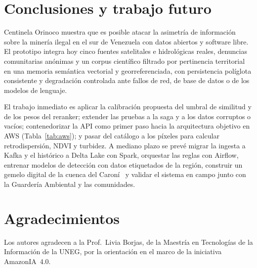 \documentclass[conference]{IEEEtran}
\begin{document}
\section{Conclusiones y trabajo futuro}\label{sec:conc}

Centinela Orinoco muestra que es posible atacar la asimetría de información sobre la minería ilegal en el sur de Venezuela con datos abiertos y software libre. El prototipo integra hoy cinco fuentes satelitales e hidrológicas reales, denuncias comunitarias anónimas y un corpus científico filtrado por pertinencia territorial en una memoria semántica vectorial y georreferenciada, con persistencia políglota consistente y degradación controlada ante fallos de red, de base de datos o de los modelos de lenguaje.

El trabajo inmediato es aplicar la calibración propuesta del umbral de similitud y de los pesos del reranker; extender las pruebas a la saga y a los datos corruptos o vacíos; contenedorizar la API como primer paso hacia la arquitectura objetivo en AWS (Tabla~\ref{tab:aws}); y pasar del catálogo a los píxeles para calcular retrodispersión, NDVI y turbidez. A mediano plazo se prevé migrar la ingesta a Kafka y el histórico a Delta Lake con Spark, orquestar las reglas con Airflow, entrenar modelos de detección con datos etiquetados de la región, construir un gemelo digital de la cuenca del Caroní~\cite{le2024} y validar el sistema en campo junto con la Guardería Ambiental y las comunidades.

\section*{Agradecimientos}
Los autores agradecen a la Prof.\ Livia Borjas, de la Maestría en Tecnologías de la Información de la UNEG, por la orientación en el marco de la iniciativa AmazonIA~4.0.
\end{document}
